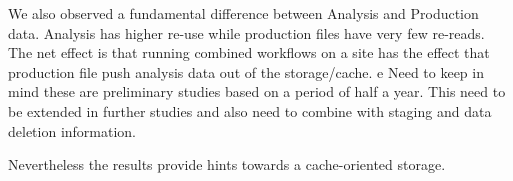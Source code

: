 We also observed a fundamental difference between Analysis and Production data. Analysis has higher re-use while production files have very few re-reads. The net effect is that running combined workflows on a site has the effect that production file push analysis data out of the storage/cache.
e
Need to keep in mind these are preliminary studies based on a period of half a year. This need to be extended in further studies and also need to combine with staging and data deletion information. 

Nevertheless the results provide hints towards a cache-oriented storage.
